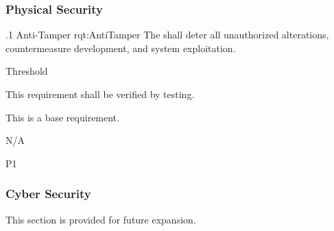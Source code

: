 \subsubsection{Physical Security}
\label{sssec_Physical_Security}


\ONERQMTV
{\RqtNumberBase.1}
{Anti-Tamper}
{rqt:AntiTamper}
{The \ThisSystem shall deter all unauthorized alterations, countermeasure development, and system exploitation.}
{
	\item [Phase 1] Threshold
}
{This requirement shall be verified by testing.}
{
\item [N/A] This is a base requirement.
}
{
	\item N/A
}
{P1}

\subsubsection{Cyber Security}
\label{sssec_Cyber_Security}

This section is provided for future expansion.